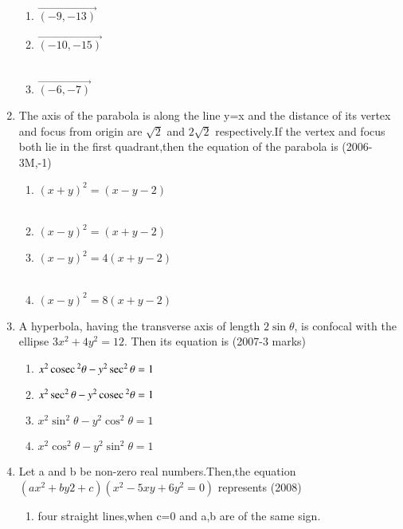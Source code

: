 \documentclass[journal,12pt,twocolumn]{IEEEtran}
\theoremstyle{remark}
\begin{document}
\begin{enumerate}
\begin{multicols}{2}
\begin{enumerate}
    \item$\vec{(-9,-13)}$
    \item$\vec{(-10,-15)}$\\\\
    \item$\vec{(-6,-7)}$
\end{enumerate}
\end{multicols}
\item The axis of the parabola is along the line y=x and the distance of its vertex and focus from  origin are $\sqrt2$ and $2\sqrt2$  respectively.If the vertex and focus both lie in the first quadrant,then the equation of the parabola is \hfill{(2006-3M,-1)}
\begin{multicols}{2}
\begin{enumerate}
    \item $(x+y)^{2}=(x-y-2)$\\\\
    \item $(x-y)^{2}=(x+y-2)$
    \item $(x-y)^{2}=4(x+y-2)$\\\\
    \item $(x-y)^{2}=8(x+y-2)$
\end{enumerate}
\end{multicols}
\item A hyperbola, having the transverse axis of length $2\sin\theta$, is confocal with the ellipse $3x^{2}+4y^{2}=12$. Then its equation is \hfill{(2007-3 marks)}
\begin{enumerate}
    \item ${x^{2}\,\text{cosec}\,^{2}\theta}-{y^{2}\sec^{2}\theta=1}$\\
    \item $x^{2}\sec^{2}\theta-y^{2}\,\text{cosec}\,^{2}\theta=1$\\
    \item $x^{2}\sin^{2}\theta-y^{2}\cos^{2}\theta=1$\\
    \item $x^{2}\cos^{2}\theta-y^{2}\sin^{2}\theta=1$\\
\end{enumerate}
\item Let a and b be non-zero real numbers.Then,the equation $(ax^{2}+by{2}+c)(x^{2}-5xy+6y^{2}=0)$ represents \hfill{(2008)}
\begin{enumerate}
    \item four straight lines,when c=0 and a,b are of the same sign.\\

\end{enumerate}
\end{enumerate}
\end{document}
